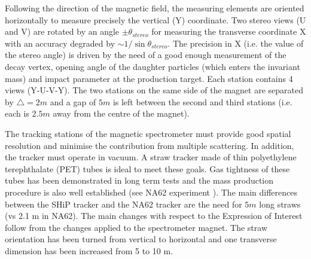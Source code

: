 	Following the direction of the magnetic field, the measuring elements are oriented horizontally to measure precisely the vertical (Y) coordinate. Two stereo views (U and V) are rotated by an angle $ \pm \theta _{stereo}$ for measuring the transverse coordinate X with an accuracy degraded by $ \sim 1/ \sin \theta _{stereo}$. The precision in X (i.e. the value of the stereo angle) is driven by the need of a good enough measurement of the decay vertex, opening angle of the daughter particles (which enters the invariant mass) and impact parameter at the production target. Each station contains 4 views (Y-U-V-Y). The two stations on the same side of the magnet are separated by $\bigtriangleup = 2 m$ and a gap of $5 m$ is left between the second and third stations (i.e. each is $2.5 m$ away from the centre of the magnet).
	
	The tracking stations of the magnetic spectrometer must provide good spatial resolution and minimise the contribution from multiple scattering. In addition, the tracker must operate in vacuum. A straw tracker made of thin polyethylene terephthalate (PET) tubes is ideal to meet these goals. Gas tightness of these tubes has been demonstrated in long term tests and the mass production procedure is also well established (see NA62 experiment \cite{NA62_TDR}). The main differences between the SHiP tracker and the NA62 tracker are the need for $5 m$ long straws (vs 2.1 m in NA62). The main changes with respect to the Expression of Interest \cite{EoI} follow from the changes applied to the spectrometer magnet. The straw orientation has been turned from vertical to horizontal and one transverse dimension has been increased from 5 to 10 m.
	